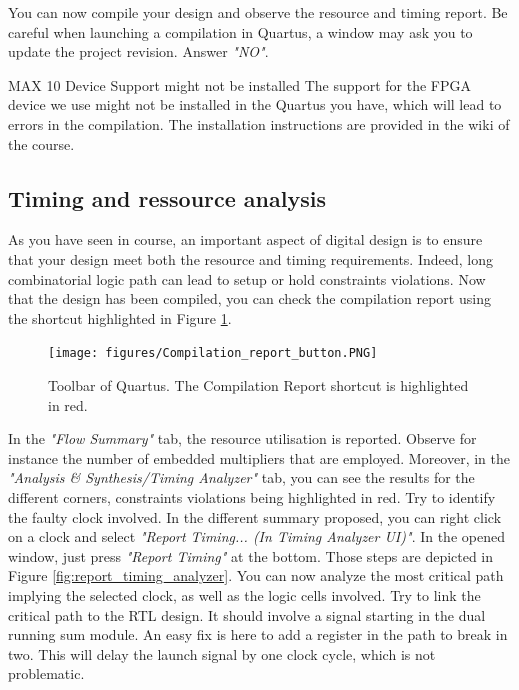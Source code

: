 You can now compile your design and observe the resource and timing report. Be careful when launching a compilation in Quartus, a window may ask you to update the project revision. Answer \textit{"NO"}.

\begin{bclogo}[couleur = gray!20, arrondi = 0.2, logo=\bcattention]{MAX 10 Device Support might not be installed}
    The support for the FPGA device we use might not be installed in the Quartus you have, which will lead to errors in the compilation. The installation instructions are provided in the wiki of the course.

\end{bclogo}

\subsection{Timing and ressource analysis}

As you have seen in course, an important aspect of digital design is to ensure that your design meet both the resource and timing requirements. Indeed, long combinatorial logic path can lead to setup or hold constraints violations. Now that the design has been compiled, you can check the compilation report using the shortcut highlighted in Figure \ref{fig:compilation_report_button}. 

\begin{figure}[h]
    \centering
    \texttt{[image: figures/Compilation\_report\_button.PNG]}
    \caption{Toolbar of Quartus. The Compilation Report shortcut is highlighted in red.}
    \label{fig:compilation_report_button}
\end{figure}


In the \textit{"Flow Summary"} tab, the resource utilisation is reported. Observe for instance the number of embedded multipliers that are employed. Moreover, in the \textit{"Analysis \& Synthesis/Timing Analyzer"} tab, you can see the results for the different corners, constraints violations being highlighted in red. Try to identify the faulty clock involved. In the different summary proposed, you can right click on a clock and select \textit{"Report Timing... (In Timing Analyzer UI)"}. In the opened window, just press \textit{"Report Timing"} at the bottom. Those steps are depicted in Figure \ref{fig:report_timing_analyzer}. You can now analyze the most critical path implying the selected clock, as well as the logic cells involved. Try to link the critical path to the RTL design. It should involve a signal starting in the dual running sum module. An easy fix is here to add a register in the path to break in two. This will delay the launch signal by one clock cycle, which is not problematic. 

